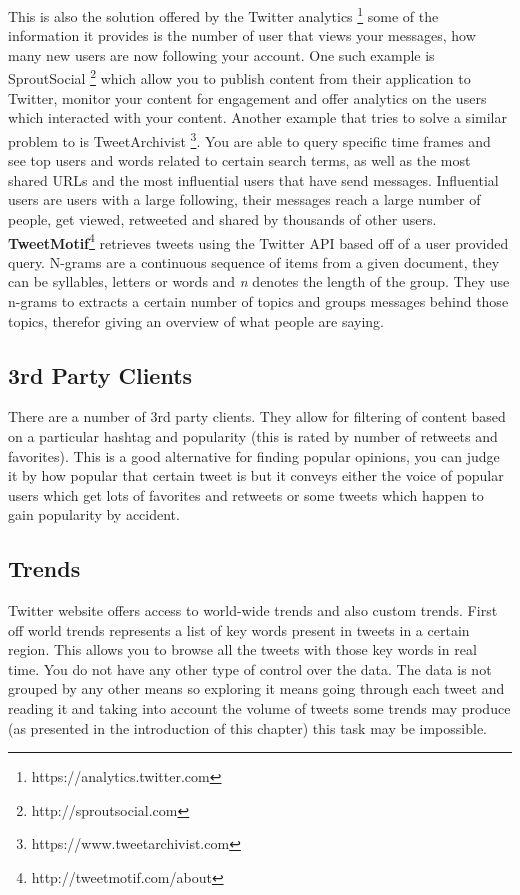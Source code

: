 This is also the solution offered by the Twitter analytics \footnote{https://analytics.twitter.com} some of the information it provides is the number of user that views your messages, how many new users are now following your account.
\newline
One such example is SproutSocial \footnote{http://sproutsocial.com} which allow you to publish content from their application to Twitter, monitor your content for engagement and offer analytics on the users which interacted with your content.
\newline
Another example that tries to solve a similar problem to {\project} is TweetArchivist \footnote{https://www.tweetarchivist.com}. You are able to query specific time frames and see top users and words related to certain search terms, as well as the most shared URLs and the most influential users that have send messages. Influential users are users with a large following, their messages reach a large number of people, get viewed, retweeted and shared by thousands of other users.
\newline
\textbf{TweetMotif}\footnote{http://tweetmotif.com/about} retrieves tweets using the Twitter API based off of a user provided query. N-grams are a continuous sequence of items from a given document, they can be syllables, letters or words and \textit{n} denotes the length of the group. They use n-grams to extracts a certain number of topics and groups messages behind those topics, therefor giving an overview of what people are saying.

\subsection{3rd Party Clients}
\label{sub-sec:tpc}

There are a number of 3rd party clients. They allow for filtering of content based on a particular hashtag and popularity (this is rated by number of retweets and favorites). This is a good alternative for finding popular opinions, you can judge it by how popular that certain tweet is but it conveys either the voice of popular users which get lots of favorites and retweets or some tweets which happen to gain popularity by accident.

\subsection{Trends}
\label{sub-sec:trends}

Twitter website offers access to world-wide trends and also custom trends. First off world trends represents a list of key words present in tweets in a certain region. This allows you to browse all the tweets with those key words in real time. You do not have any other type of control over the data. The data is not grouped by any other means so exploring it means going through each tweet and reading it and taking into account the volume of tweets some trends may produce (as presented in the introduction of this chapter) this task may be impossible.

